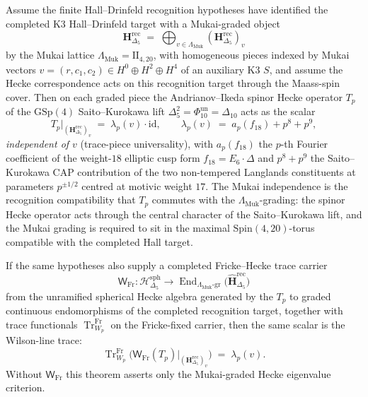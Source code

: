\begin{theorem}
\label{thm:dl-kazhdan-C1-mukai-eigenvalue}
\ClaimStatusConditional
{}
Assume the finite Hall--Drinfeld recognition hypotheses have identified the
completed K3 Hall--Drinfeld target with a Mukai-graded object
\[
\mathbf{H}_{\Delta_5}^{\mathrm{rec}}
\;=\;
\bigoplus_{v \in \Lambda_{\mathrm{Muk}}}
(\mathbf{H}_{\Delta_5}^{\mathrm{rec}})_v
\]
by the Mukai lattice $\Lambda_{\mathrm{Muk}} = \mathrm{II}_{4, 20}$, with
homogeneous pieces indexed by Mukai vectors $v = (r, c_1, c_2) \in
H^0 \oplus H^2 \oplus H^4$ of an auxiliary K3 $S$, and assume the
Hecke correspondence acts on this recognition target through the
Maass-spin cover. Then on each graded piece the Andrianov--Ikeda spinor
Hecke operator $T_p$ of the $\mathrm{GSp}(4)$ Saito--Kurokawa lift
$\Delta_5^2=\Phi_{10}^{\mathrm{un}}=\Delta_{10}$ acts as the scalar
\begin{equation}
\label{eq:kazhdan-C1-eigenvalue}
 T_p \big|_{(\mathbf{H}_{\Delta_5}^{\mathrm{rec}})_v}
 \;=\;
 \lambda_p(v) \cdot \mathrm{id},
 \qquad
 \lambda_p(v)
 \;=\;
 a_p(f_{18}) + p^8 + p^9,
\end{equation}
\emph{independent of $v$} (trace-piece universality), with
$a_p(f_{18})$ the $p$-th Fourier coefficient of the weight-$18$
elliptic cusp form $f_{18} = E_6 \cdot \Delta$ and
$p^8 + p^9$ the Saito--Kurokawa CAP contribution of the two
non-tempered Langlands constituents at parameters $p^{\pm 1/2}$
centred at motivic weight $17$. The Mukai independence is the
recognition compatibility that $T_p$ commutes with the
$\Lambda_{\mathrm{Muk}}$-grading: the spinor Hecke operator acts through
the central character of the Saito--Kurokawa lift, and the Mukai grading
is required to sit in the maximal $\mathrm{Spin}(4, 20)$-torus compatible
with the completed Hall target.

If the same hypotheses also supply a completed Fricke--Hecke
trace carrier
\[
 \mathsf W_{\mathrm{Fr}}\colon
 \mathcal H^{\mathrm{sph}}_{\Delta_5}
 \longrightarrow
 \operatorname{End}_{\Lambda_{\mathrm{Muk}}\text{-gr}}
 \bigl(\widehat{\mathbf{H}}_{\Delta_5}^{\mathrm{rec}}\bigr)
\]
from the unramified spherical Hecke algebra generated by the $T_p$ to
graded continuous endomorphisms of the completed recognition target,
together with trace functionals
$\operatorname{Tr}^{\mathrm{Fr}}_{W_p}$ on the Fricke-fixed carrier,
then the same scalar is the Wilson-line trace:
\[
\operatorname{Tr}^{\mathrm{Fr}}_{W_p}
\bigl(\mathsf W_{\mathrm{Fr}}(T_p)
|_{(\mathbf{H}_{\Delta_5}^{\mathrm{rec}})_v}\bigr)
\;=\;\lambda_p(v).
\]
Without \(\mathsf W_{\mathrm{Fr}}\) this theorem asserts only the
Mukai-graded Hecke eigenvalue criterion.
\end{theorem}

